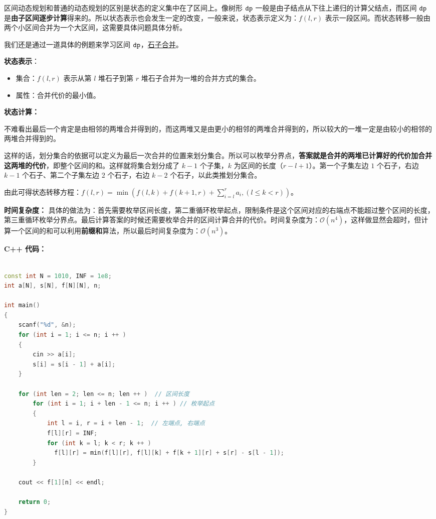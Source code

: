 
区间动态规划和普通的动态规划的区别是状态的定义集中在了区间上。像树形 $\tt dp$ 一般是由子结点从下往上递归的计算父结点，而区间 $\tt dp$ 是\textbf{由子区间逐步计算}得来的。所以状态表示也会发生一定的改变，一般来说，状态表示定义为：$f(l, r)$ 表示一段区间。而状态转移一般由两个小区间合并为一个大区间，这需要具体问题具体分析。

我们还是通过一道具体的例题来学习区间 $\tt dp$，\href{https://www.luogu.com.cn/problem/P1775}{石子合并}。

\textbf{状态表示}：
\begin{itemize}
\item 集合：$f(l, r)$ 表示从第 $l$ 堆石子到第 $r$ 堆石子合并为一堆的合并方式的集合。
\item 属性：合并代价的最小值。
\end{itemize}

\textbf{状态计算：}

不难看出最后一个肯定是由相邻的两堆合并得到的，而这两堆又是由更小的相邻的两堆合并得到的，所以较大的一堆一定是由较小的相邻的两堆合并得到的。

这样的话，划分集合的依据可以定义为最后一次合并的位置来划分集合。所以可以枚举分界点，\textbf{答案就是合并的两堆已计算好的代价加合并这两堆的代价}，即整个区间的和。这样就将集合划分成了 $k - 1$ 个子集，$k$ 为区间的长度（$r - l + 1$）。第一个子集左边 $1$ 个石子，右边 $k - 1$ 个石子、第二个子集左边 $2$ 个石子，右边 $k - 2$ 个石子，以此类推划分集合。

由此可得状态转移方程：$f(l, r) = \min(f(l, k) + f(k + 1, r) + \sum^{r}_{i = l}a_i, (l \leq k < r))$。

\textbf{时间复杂度：} 具体的做法为：首先需要枚举区间长度，第二重循环枚举起点，限制条件是这个区间对应的右端点不能超过整个区间的长度，第三重循环枚举分界点。最后计算答案的时候还需要枚举合并的区间计算合并的代价。时间复杂度为：$\mathcal{O}(n^4)$，这样做显然会超时，但计算一个区间的和可以利用\textbf{前缀和}算法，所以最后时间复杂度为：$\mathcal{O}(n^3)$。

\textbf{C++ 代码：}

\begin{lstlisting}[language=cpp]

const int N = 1010, INF = 1e8;
int a[N], s[N], f[N][N], n;

int main()
{
    scanf("%d", &n);
    for (int i = 1; i <= n; i ++ ) 
    {
        cin >> a[i];
        s[i] = s[i - 1] + a[i];
    }

    for (int len = 2; len <= n; len ++ )  // 区间长度
        for (int i = 1; i + len - 1 <= n; i ++ ) // 枚举起点
        {
            int l = i, r = i + len - 1;  // 左端点, 右端点
            f[l][r] = INF;
            for (int k = l; k < r; k ++ ) 
              f[l][r] = min(f[l][r], f[l][k] + f[k + 1][r] + s[r] - s[l - 1]);
        }

    cout << f[1][n] << endl;

    return 0;
}
\end{lstlisting}

